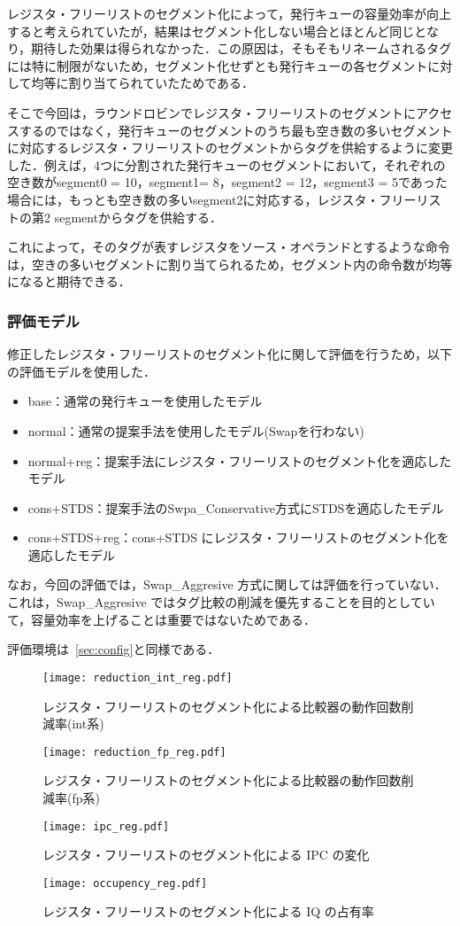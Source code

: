 \documentclass[twocolumn]{jsarticle}
\begin{document}
  レジスタ・フリーリストのセグメント化によって，発行キューの容量効率が向上すると考えられていたが，結果はセグメント化しない場合とほとんど同じとなり，期待した効果は得られなかった．この原因は，そもそもリネームされるタグには特に制限がないため，セグメント化せずとも発行キューの各セグメントに対して均等に割り当てられていたためである．
  
  そこで今回は，ラウンドロビンでレジスタ・フリーリストのセグメントにアクセスするのではなく，発行キューのセグメントのうち最も空き数の多いセグメントに対応するレジスタ・フリーリストのセグメントからタグを供給するように変更した．例えば，4つに分割された発行キューのセグメントにおいて，それぞれの空き数がsegment0 = 10，segment1= 8，segment2 = 12，segment3 = 5であった場合には，もっとも空き数の多いsegment2に対応する，レジスタ・フリーリストの第2 segmentからタグを供給する．
  
  これによって，そのタグが表すレジスタをソース・オペランドとするような命令は，空きの多いセグメントに割り当てられるため，セグメント内の命令数が均等になると期待できる．
  \clearpage
  \subsubsection{評価モデル}
  修正したレジスタ・フリーリストのセグメント化に関して評価を行うため，以下の評価モデルを使用した．
  \begin{itemize}
    \item base：通常の発行キューを使用したモデル
    \item normal：通常の提案手法を使用したモデル(Swapを行わない)
    \item normal+reg：提案手法にレジスタ・フリーリストのセグメント化を適応したモデル
    \item cons+STDS：提案手法のSwpa\_Conservative方式にSTDSを適応したモデル
    \item cons+STDS+reg：cons+STDS にレジスタ・フリーリストのセグメント化を適応したモデル
  \end{itemize}
  なお，今回の評価では，Swap\_Aggresive 方式に関しては評価を行っていない．これは，Swap\_Aggresive ではタグ比較の削減を優先することを目的としていて，容量効率を上げることは重要ではないためである．

  評価環境は~\ref{sec:config}と同様である．

  \begin{figure*}[ht]
    \centering
    \texttt{[image: reduction\_int\_reg.pdf]}
    \caption{レジスタ・フリーリストのセグメント化による比較器の動作回数削減率(int系)}
    \label{fig:reduction_int_reg}

    \texttt{[image: reduction\_fp\_reg.pdf]}
    \caption{レジスタ・フリーリストのセグメント化による比較器の動作回数削減率(fp系)}
    \label{fig:reduction_fp_reg}
    
    \texttt{[image: ipc\_reg.pdf]}
    \caption{レジスタ・フリーリストのセグメント化による IPC の変化}
    \label{fig:ipc_reg}

    \texttt{[image: occupency\_reg.pdf]}
    \caption{レジスタ・フリーリストのセグメント化による IQ の占有率}
    \label{fig:occupency_reg}
  \end{figure*}
\end{document}
